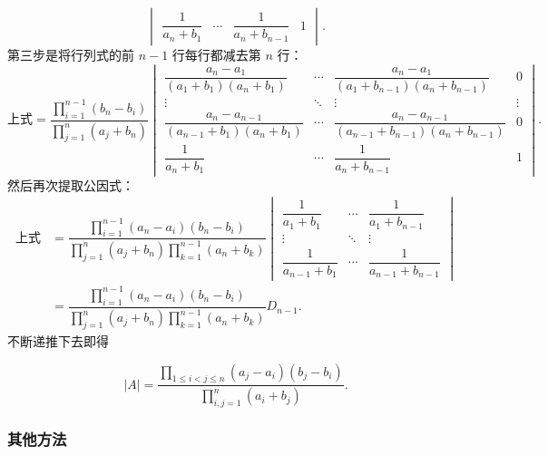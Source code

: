 \begin{solution}
\[\begin{vmatrix}
            \dfrac{1}{a_n+b_1}     & \cdots & \dfrac{1}{a_n+b_{n-1}}     & 1
        \end{vmatrix}. \]
    第三步是将行列式的前 $n-1$ 行每行都减去第 $n$ 行：
    \[ \text{上式} = \dfrac{\prod\limits_{i=1}^{n-1}(b_n-b_i)}{\prod\limits_{j=1}^{n}(a_j+b_n)}
        \begin{vmatrix}
            \dfrac{a_n-a_1}{(a_1+b_1)(a_n+b_1)}         & \cdots & \dfrac{a_n-a_1}{(a_1+b_{n-1})(a_n+b_{n-1})}         & 0      \\[2ex]
            \vdots                                      & \ddots & \vdots                                              & \vdots \\[2ex]
            \dfrac{a_n-a_{n-1}}{(a_{n-1}+b_1)(a_n+b_1)} & \cdots & \dfrac{a_n-a_{n-1}}{(a_{n-1}+b_{n-1})(a_n+b_{n-1})} & 0      \\[2ex]
            \dfrac{1}{a_n+b_1}                          & \cdots & \dfrac{1}{a_n+b_{n-1}}                              & 1
        \end{vmatrix}. \]
    然后再次提取公因式：
    \begin{align*}
        \text{上式} & = \dfrac{\prod\limits_{i=1}^{n-1}(a_n-a_i)(b_n-b_i)}{\prod\limits_{j=1}^{n}(a_j+b_n)\prod\limits_{k=1}^{n-1}(a_n+b_k)}
        \begin{vmatrix}
            \dfrac{1}{a_1+b_1}     & \cdots & \dfrac{1}{a_1+b_{n-1}}     \\[2ex]
            \vdots                 & \ddots & \vdots                     \\[2ex]
            \dfrac{1}{a_{n-1}+b_1} & \cdots & \dfrac{1}{a_{n-1}+b_{n-1}}
        \end{vmatrix}                                                         \\[2ex]
                    & = \dfrac{\prod\limits_{i=1}^{n-1}(a_n-a_i)(b_n-b_i)}{\prod\limits_{j=1}^{n}(a_j+b_n)\prod\limits_{k=1}^{n-1}(a_n+b_k)} D_{n-1}.
    \end{align*}
    不断递推下去即得

    \[|A| = \dfrac{\prod\limits_{1 \leqslant i < j \leqslant n}(a_j - a_i)(b_j - b_i)}{\prod\limits_{i,j=1}^{n}(a_i + b_j)}.\]
\end{solution}


\subsubsection{其他方法}

